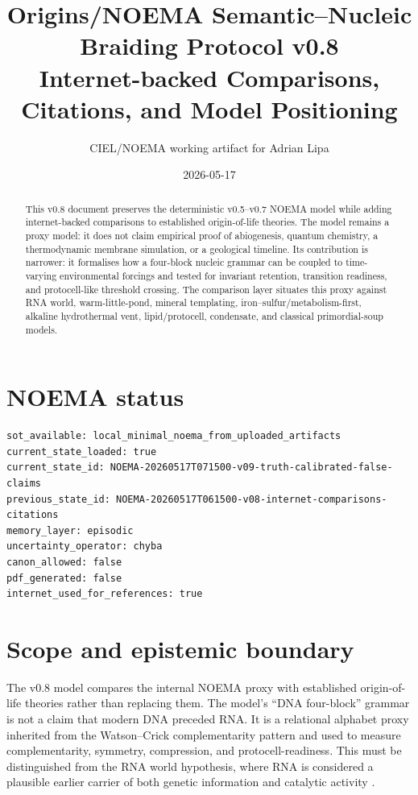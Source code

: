\documentclass[11pt]{article}
\title{Origins/NOEMA Semantic--Nucleic Braiding Protocol v0.8\\
\large Internet-backed Comparisons, Citations, and Model Positioning}
\author{CIEL/NOEMA working artifact for Adrian Lipa}
\date{2026-05-17}
\begin{document}
\maketitle

\begin{abstract}
This v0.8 document preserves the deterministic v0.5--v0.7 NOEMA model while adding internet-backed comparisons to established origin-of-life theories. The model remains a proxy model: it does not claim empirical proof of abiogenesis, quantum chemistry, a thermodynamic membrane simulation, or a geological timeline. Its contribution is narrower: it formalises how a four-block nucleic grammar can be coupled to time-varying environmental forcings and tested for invariant retention, transition readiness, and protocell-like threshold crossing. The comparison layer situates this proxy against RNA world, warm-little-pond, mineral templating, iron--sulfur/metabolism-first, alkaline hydrothermal vent, lipid/protocell, condensate, and classical primordial-soup models.
\end{abstract}

\section*{NOEMA status}
\begin{verbatim}
sot_available: local_minimal_noema_from_uploaded_artifacts
current_state_loaded: true
current_state_id: NOEMA-20260517T071500-v09-truth-calibrated-false-claims
previous_state_id: NOEMA-20260517T061500-v08-internet-comparisons-citations
memory_layer: episodic
uncertainty_operator: chyba
canon_allowed: false
pdf_generated: false
internet_used_for_references: true
\end{verbatim}

\section{Scope and epistemic boundary}
The v0.8 model compares the internal NOEMA proxy with established origin-of-life theories rather than replacing them. The model's ``DNA four-block'' grammar is not a claim that modern DNA preceded RNA. It is a relational alphabet proxy inherited from the Watson--Crick complementarity pattern \cite{WatsonCrick1953} and used to measure complementarity, symmetry, compression, and protocell-readiness. This must be distinguished from the RNA world hypothesis, where RNA is considered a plausible earlier carrier of both genetic information and catalytic activity \cite{RobertsonJoyce2012}.
\end{document}
